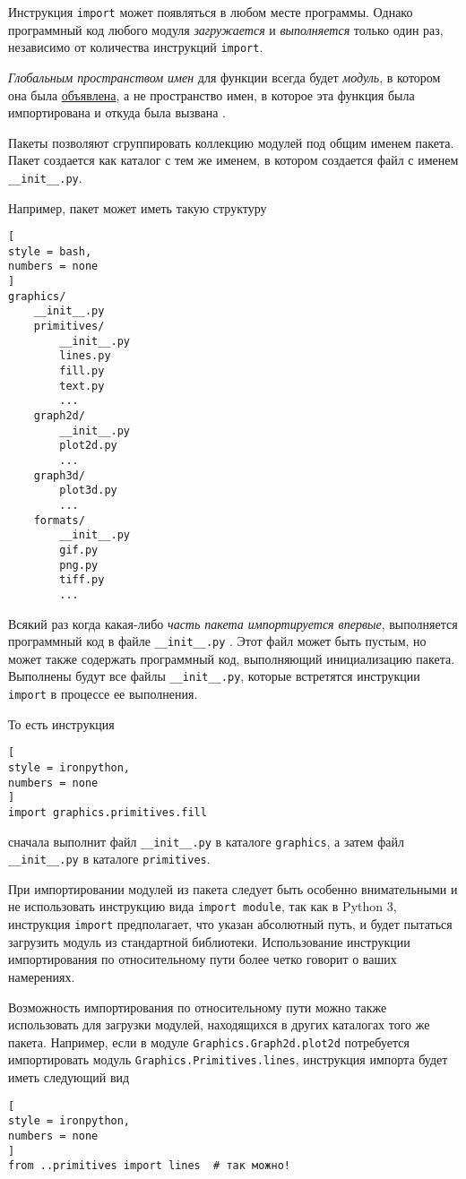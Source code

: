 \documentclass[%
	11pt,
	a4paper,
	utf8,
		]{article}
\begin{document}
Инструкция \texttt{import} может появляться в любом месте программы. Однако программный код любого модуля \emph{загружается} и \emph{выполняется} только один раз, независимо от количества инструкций \texttt{import}. 

\emph{Глобальным пространством имен} для функции всегда будет \emph{модуль}, в котором она была \underline{объявлена}, а не пространство имен, в которое эта функция была импортирована и откуда была вызвана \cite[]{beazley:python-2010}.

Пакеты позволяют сгруппировать коллекцию модулей под общим именем пакета. Пакет создается как каталог с тем же именем, в котором создается файл с именем \verb|__init__.py|.

Например, пакет может иметь такую структуру
\begin{lstlisting}[
style = bash,
numbers = none
]
graphics/
    __init__.py
    primitives/
        __init__.py
        lines.py
        fill.py
        text.py
        ...
    graph2d/
        __init__.py
        plot2d.py
        ...
    graph3d/
        plot3d.py
        ...
    formats/
        __init__.py
        gif.py
        png.py
        tiff.py
        ...
\end{lstlisting}

Всякий раз когда какая-либо \emph{часть пакета импортируется впервые}, выполняется программный код в файле \verb|__init__.py| \cite[]{beazley:python-2010}. Этот файл может быть пустым, но может также содержать программный код, выполняющий инициализацию пакета. Выполнены будут все файлы \verb|__init__.py|, которые встретятся инструкции \texttt{import} в процессе ее выполнения.

То есть инструкция
\begin{lstlisting}[
style = ironpython,
numbers = none
]
import graphics.primitives.fill
\end{lstlisting}
сначала выполнит файл \verb|__init__.py| в каталоге \texttt{graphics}, а затем файл \verb|__init__.py| в каталоге \texttt{primitives}.

При импортировании модулей из пакета следует быть особенно внимательными и не использовать инструкцию вида \texttt{import module}, так как в Python 3, инструкция \texttt{import} предполагает, что указан абсолютный путь, и будет пытаться загрузить модуль из стандартной библиотеки. Использование инструкции импортирования по относительному пути более четко говорит о ваших намерениях.

Возможность импортирования по относительному пути можно также использовать для загрузки модулей, находящихся в других каталогах того же пакета. Например, если в модуле \texttt{Graphics.Graph2d.plot2d} потребуется импортировать модуль \texttt{Graphics.Primitives.lines}, инструкция импорта будет иметь следующий вид
\begin{lstlisting}[
style = ironpython,
numbers = none
]
from ..primitives import lines  # так можно!
\end{lstlisting}
\end{document}
